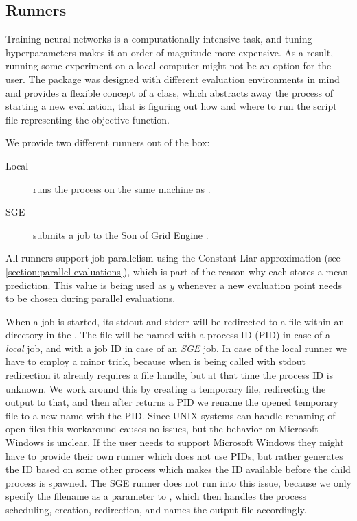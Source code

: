 \subsection{Runners}
\label{section:runners}

Training neural networks is a computationally intensive task, and tuning hyperparameters makes it an order of magnitude more expensive. As a result, running some experiment on a local computer might not be an option for the user. The package was designed with different evaluation environments in mind and provides a flexible concept of a  class, which abstracts away the process of starting a new evaluation, that is figuring out how and where to run the script file representing the objective function.

We provide two different runners out of the box:

\begin{description}
    \item[Local] runs the process on the same machine as \bopt.
    \item[SGE] submits a job to the Son of Grid Engine \citep{sge}.
\end{description}

All runners support job parallelism using the Constant Liar approximation (see \autoref{section:parallel-evaluations}), which is part of the reason why each  stores a mean prediction. This value is being used as $y$ whenever a new evaluation point needs to be chosen during parallel evaluations.

When a job is started, its stdout and stderr will be redirected to a file within an  directory in the . The file will be named with a process ID (PID) in case of a \emph{local} job, and with a job ID in case of an \emph{SGE} job. In case of the local runner we have to employ a minor trick, because when  is being called with stdout redirection it already requires a file handle, but at that time the process ID is unknown. We work around this by creating a temporary file, redirecting the output to that, and then after  returns a PID we rename the opened temporary file to a new name with the PID. Since UNIX systems can handle renaming of open files this workaround causes no issues, but the behavior on Microsoft Windows is unclear. If the user needs to support Microsoft Windows they might have to provide their own runner which does not use PIDs, but rather generates the ID based on some other process which makes the ID available before the child process is spawned. The SGE runner does not run into this issue, because we only specify the filename as a parameter to , which then handles the process scheduling, creation, redirection, and names the output file accordingly.

